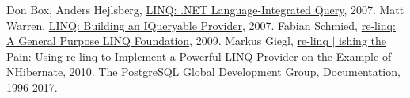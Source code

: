 
 Don Box, Anders Hejlsberg, \href{https://msdn.microsoft.com/en-us/library/bb308959.aspx}{LINQ: .NET Language-Integrated Query}, 2007.
 Matt Warren, \href{https://blogs.msdn.microsoft.com/mattwar/2007/07/30/linq-building-an-iqueryable-provider-part-i/}{LINQ: Building an IQueryable Provider}, 2007.
 Fabian Schmied, \href{https://www.re-motion.org/download/re-linq.pdf}{re-linq: A General Purpose LINQ Foundation}, 2009.
 Markus Giegl, \href{https://www.codeproject.com/Articles/42059/re-linq-ishing-the-Pain-Using-re-linq-to-Implement}{re-linq $\vert$ ishing the Pain: Using re-linq to Implement a Powerful LINQ Provider on the Example of NHibernate}, 2010.
 The PostgreSQL Global Development Group, \href{https://www.postgresql.org/docs/}{Documentation}, 1996-2017.